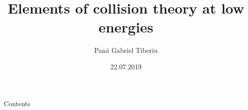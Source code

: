 \documentclass[fleqn]{beamer}
\title{Elements of collision theory at low energies}
\author{Pan\u{a} Gabriel Tiberiu}
\date{22.07.2019}
\begin{document}
\footnotesize
  \maketitle
  \begin{frame}[allowframebreaks]{Contents}
   \tableofcontents
  \end{frame}

  
  
\end{document}

